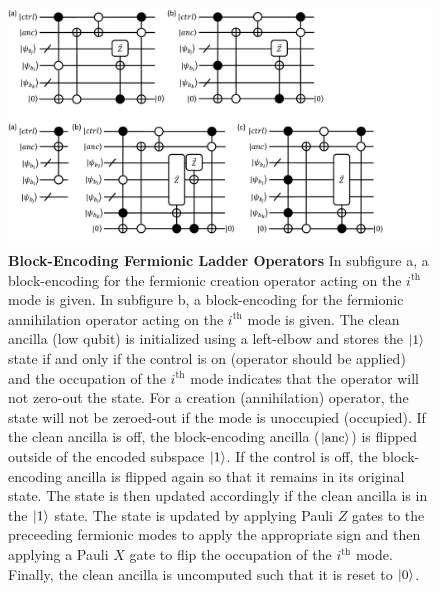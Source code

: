 \begin{figure}[h]
    \includegraphics[width=12cm]{figures/fermionic-be.pdf}
    \caption{
        \textbf{Block-Encoding Fermionic Ladder Operators}
        In subfigure a, a block-encoding for the fermionic creation operator acting on the $i^\text{th}$ mode is given.
        In subfigure b, a block-encoding for the fermionic annihilation operator acting on the $i^\text{th}$ mode is given.
        The clean ancilla (low qubit) is initialized using a left-elbow and stores the $\ket{1}$ state if and only if the control is on (operator should be applied) and the occupation of the $i^\text{th}$ mode indicates that the operator will not zero-out the state.
        For a creation (annihilation) operator, the state will not be zeroed-out if the mode is unoccupied (occupied).
        If the clean ancilla is off, the block-encoding ancilla ($\ket{\text{anc}}$) is flipped outside of the encoded subspace $\ket{1}$.
        If the control is off, the block-encoding ancilla is flipped again so that it remains in its original state.
        The state is then updated accordingly if the clean ancilla is in the $\ket{1}$ state.
        The state is updated by applying Pauli $Z$ gates to the preceeding fermionic modes to apply the appropriate sign and then applying a Pauli $X$ gate to flip the occupation of the $i^\text{th}$ mode.
        Finally, the clean ancilla is uncomputed such that it is reset to $\ket{0}$.
    }
    \label{fig:fermionic-be}
\end{figure}


